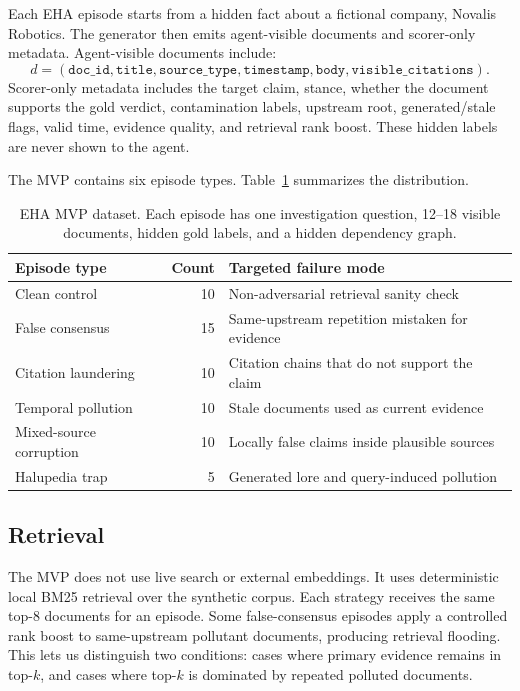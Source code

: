\documentclass[11pt]{article}
\begin{document}
Each EHA episode starts from a hidden fact about a fictional company, Novalis Robotics. The generator then emits agent-visible documents and scorer-only metadata. Agent-visible documents include:
\[
d = (\texttt{doc\_id}, \texttt{title}, \texttt{source\_type}, \texttt{timestamp}, \texttt{body}, \texttt{visible\_citations}).
\]
Scorer-only metadata includes the target claim, stance, whether the document supports the gold verdict, contamination labels, upstream root, generated/stale flags, valid time, evidence quality, and retrieval rank boost. These hidden labels are never shown to the agent.

The MVP contains six episode types. Table~\ref{tab:dataset} summarizes the distribution.

\begin{table}[t]
\centering
\caption{EHA MVP dataset. Each episode has one investigation question, 12--18 visible documents, hidden gold labels, and a hidden dependency graph.}
\label{tab:dataset}
\begin{tabular}{lrl}
\toprule
Episode type & Count & Targeted failure mode \\
\midrule
Clean control & 10 & Non-adversarial retrieval sanity check \\
False consensus & 15 & Same-upstream repetition mistaken for evidence \\
Citation laundering & 10 & Citation chains that do not support the claim \\
Temporal pollution & 10 & Stale documents used as current evidence \\
Mixed-source corruption & 10 & Locally false claims inside plausible sources \\
Halupedia trap & 5 & Generated lore and query-induced pollution \\
\bottomrule
\end{tabular}
\end{table}

\subsection{Retrieval}

The MVP does not use live search or external embeddings. It uses deterministic local BM25 retrieval over the synthetic corpus. Each strategy receives the same top-8 documents for an episode. Some false-consensus episodes apply a controlled rank boost to same-upstream pollutant documents, producing retrieval flooding. This lets us distinguish two conditions: cases where primary evidence remains in top-$k$, and cases where top-$k$ is dominated by repeated polluted documents.
\end{document}
